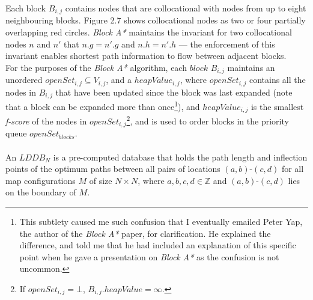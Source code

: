 \documentclass[12pt,notitlepage]{report}
\begin{document}
\noindent
Each block $B_{i,j}$ contains nodes that are collocational with nodes from up to eight neighbouring blocks. Figure 2.7 shows collocational nodes as two or four partially overlapping red circles. {\em Block A*} maintains the invariant for two collocational nodes $n$ and $n'$ that $n.g = n'.g$ and $n.h = n'.h$ --- the enforcement of this invariant enables shortest path information to flow between adjacent blocks.\\

\noindent
For the purposes of the {\em Block A*} algorithm, each $block$ $B_{i,j}$ maintains an unordered $openSet_{i,j} \subseteq V_{i,j}$, and a $heapValue_{i,j}$, where $openSet_{i,j}$ contains all the nodes in $B_{i,j}$ that have been updated since the block was last expanded (note that a block can be expanded more than once\footnote{This subtlety caused me such confusion that I eventually emailed Peter Yap, the author of the {\em Block A*} paper, for clarification. He explained the difference, and told me that he had included an explanation of this specific point when he gave a presentation on {\em Block A*} as the confusion is not uncommon.}), and $heapValue_{i,j}$ is the smallest {\em f-score} of the nodes in $openSet_{i,j}$\footnote{If $openSet_{i,j} = \bot$, $B_{i,j}.heapValue = \infty$.}, and is used to order blocks in the priority queue $openSet_{blocks}$.\\


\\
\noindent
An $LDDB_{N}$ is a pre-computed database that holds the path length and inflection points of the optimum paths between all pairs of locations $(a,b)$-$(c,d)$ for all map configurations $M$ of size $N \times N$, where $a,b,c,d \in \mathbb{Z}$ and $(a,b)$-$(c,d)$ lies on the boundary of $M$.\\
\end{document}
